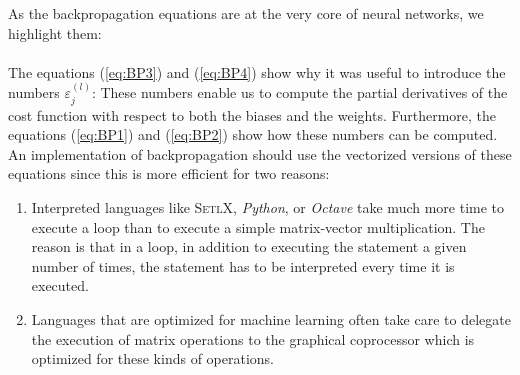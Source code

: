 As the backpropagation equations are at the very core of neural networks, we highlight them:
\\[0.2cm]
\hspace*{0.3cm}
\colorbox{red}{}
\\[0.2cm]
The equations (\ref{eq:BP3}) and (\ref{eq:BP4}) show why it was useful to introduce the
numbers $\varepsilon_j^{(l)}$: These numbers enable us to compute the partial derivatives of the cost function
with respect to both the biases and the weights.  Furthermore, the equations (\ref{eq:BP1}) and (\ref{eq:BP2})
show how these numbers can be computed.  An implementation of backpropagation should use the vectorized
versions of these equations since this is more efficient for two reasons:
\begin{enumerate}
\item Interpreted languages like \textsc{SetlX}, \textsl{Python}, or \textsl{Octave} take much more time to
      execute a loop than to execute a simple matrix-vector multiplication.  The reason is that in a loop, in
      addition to executing the statement a given number of times, the statement has to be interpreted 
      every time it is executed.
\item Languages that are optimized for machine learning often take care to delegate the execution of matrix
      operations to the graphical coprocessor which is optimized for these kinds of operations.  
\end{enumerate}

